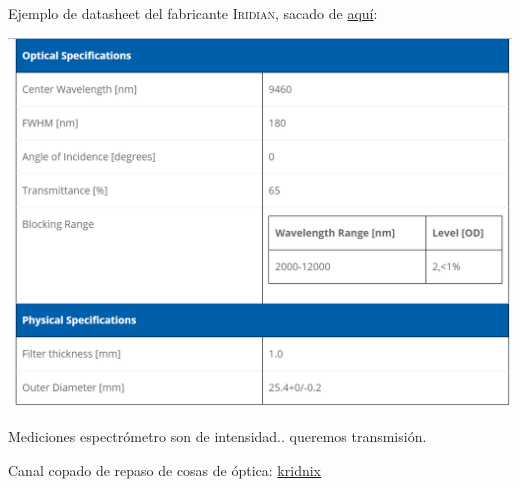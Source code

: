 \documentclass[12pt,dvipsnames]{exam}
\begin{document}
Ejemplo de datasheet del fabricante \textsc{Iridian}, sacado de \href{https://www.iridian.ca/product/bpf-9460-180/}{aquí}:

\begin{center}
	\includegraphics[scale=0.8]{imgs/datasheet_modelo.png}
\end{center}

Mediciones espectrómetro son de intensidad.. queremos transmisión.

Canal copado de repaso de cosas de óptica: \href{https://www.youtube.com/user/kridnix/videos}{kridnix}
\end{document}
